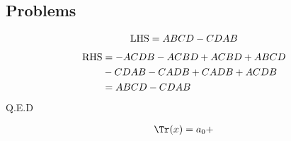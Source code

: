 \subsection*{Problems}

\begin{exercise}[1.1]
  \begin{equation}
    \begin{aligned}
      {\rm LHS} = ABCD - CDAB
    \end{aligned}
  \end{equation}
  \begin{equation}
    \begin{aligned}
      {\rm RHS} &= -ACDB - ACBD + ACBD + ABCD \\
                & - CDAB - CADB + CADB + ACDB \\
                &= ABCD - CDAB
    \end{aligned}
  \end{equation}
  Q.E.D
\end{exercise}

\begin{exercise}[1.2]
  \begin{equation}
    \begin{aligned}
      \Tr(x) = a_0 + 
    \end{aligned}
  \end{equation}
\end{exercise}
